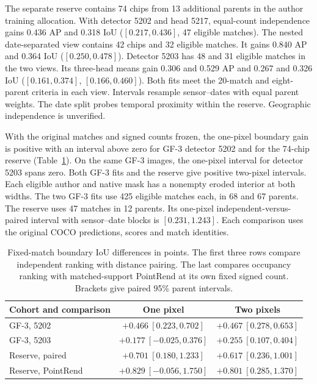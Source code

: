 \documentclass[journal]{IEEEtran}
\begin{document}
The separate reserve contains 74 chips from 13 additional parents in the author training allocation. With detector 5202 and head 5217, equal-count independence gains 0.436 AP and 0.318 IoU (\([0.217,0.436]\), 47 eligible matches). The nested date-separated view contains 42 chips and 32 eligible matches. It gains 0.840 AP and 0.364 IoU (\([0.250,0.478]\)). Detector 5203 has 48 and 31 eligible matches in the two views. Its three-head means gain 0.306 and 0.529 AP and 0.267 and 0.326 IoU (\([0.161,0.374]\), \([0.166,0.460]\)). Both fits meet the 20-match and eight-parent criteria in each view. Intervals resample sensor--dates with equal parent weights. The date split probes temporal proximity within the reserve. Geographic independence is unverified.

With the original matches and signed counts frozen, the one-pixel boundary gain is positive with an interval above zero for GF-3 detector 5202 and for the 74-chip reserve (Table~\ref{tab:native-boundary}). On the same GF-3 images, the one-pixel interval for detector 5203 spans zero. Both GF-3 fits and the reserve give positive two-pixel intervals. Each eligible author and native mask has a nonempty eroded interior at both widths. The two GF-3 fits use 425 eligible matches each, in 68 and 67 parents. The reserve uses 47 matches in 12 parents. Its one-pixel independent-versus-paired interval with sensor--date blocks is \([0.231,1.243]\). Each comparison uses the original COCO predictions, scores and match identities.

\begin{table}[t]
\centering
\caption{Fixed-match boundary IoU differences in points. The first three rows compare independent ranking with distance pairing. The last compares occupancy ranking with matched-support PointRend at its own fixed signed count. Brackets give paired 95\% parent intervals.}
\label{tab:native-boundary}
\footnotesize
\setlength{\tabcolsep}{2.5pt}
\begin{tabular}{@{}lcc@{}}
\toprule
Cohort and comparison & One pixel & Two pixels\\
\midrule
GF-3, 5202 & \(+0.466\ [0.223,0.702]\) & \(+0.467\ [0.278,0.653]\)\\
GF-3, 5203 & \(+0.177\ [-0.025,0.376]\) & \(+0.255\ [0.107,0.404]\)\\
Reserve, paired & \(+0.701\ [0.180,1.233]\) & \(+0.617\ [0.236,1.001]\)\\
Reserve, PointRend & \(+0.829\ [-0.056,1.750]\) & \(+0.801\ [0.285,1.370]\)\\
\bottomrule
\end{tabular}
\end{table}
\end{document}
